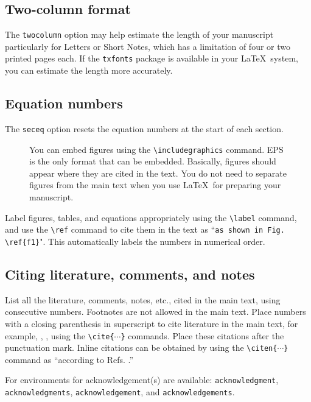 \documentclass[letter,twocolumn]{jpsj3}
\begin{document}
\subsection{Two-column format}

The \verb|twocolumn| option may help estimate the length of your manuscript particularly for Letters or Short Notes, which has a limitation of four or two printed pages each. If the \verb|txfonts| package is available in your \LaTeX\ system, you can estimate the length more accurately.

\subsection{Equation numbers}

The \verb|seceq| option resets the equation numbers at the start of each section.


\begin{figure}
\caption{You can embed figures using the \texttt{\textbackslash includegraphics} command. EPS is the only format that can be embedded. Basically, figures should appear where they are cited in the text. You do not need to separate figures from the main text when you use \LaTeX\ for preparing your manuscript.}
\label{f1}
\end{figure}

Label figures, tables, and equations appropriately using the \verb|\label| command, and use the \verb|\ref| command to cite them in the text as ``\verb|as shown in Fig. \ref{f1}|". This automatically labels the numbers in numerical order.

\subsection{Citing literature, comments, and notes}

List all the literature, comments, notes, etc., cited in the main text, using consecutive numbers.  Footnotes are not allowed in the main text.  Place numbers with a closing parenthesis in superscript to cite literature in the main text, for example, \cite{jpsj} \cite{instructions,etal}, \cite{jpsj,instructions,etal,ibid,Errata}, using the \verb|\cite{|$\cdots$\verb|}| commands. Place these citations after the punctuation mark.  Inline citations can be obtained by using the \verb|\citen{|$\cdots$\verb|}| command as ``according to Refs. .''

\begin{acknowledgment}


For environments for acknowledgement(s) are available: \verb|acknowledgment|, \verb|acknowledgments|, \verb|acknowledgement|, and \verb|acknowledgements|.

\end{acknowledgment}
\end{document}
